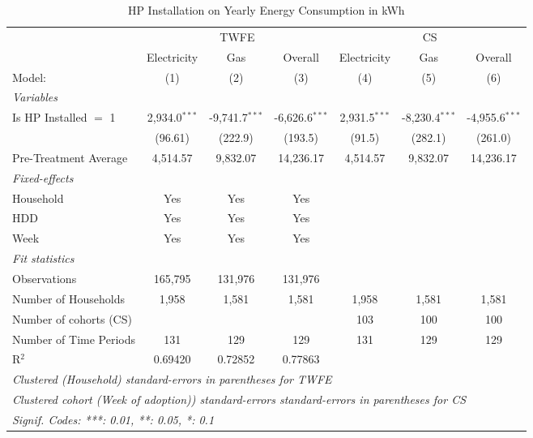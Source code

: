 
\begin{table}[htbp]
   \caption{\label{tab:hp-did-never-treated} HP Installation on Yearly Energy Consumption in kWh}
   \centering
   \begin{tabular}{lcccccc}
      \tabularnewline \midrule \midrule
       & \multicolumn{3}{c}{TWFE} & \multicolumn{3}{c}{CS} \\ 
                                     & Electricity     & Gas              & Overall          & Electricity     & Gas              & Overall \\   
      Model:                         & (1)             & (2)              & (3)              & (4)             & (5)              & (6)\\  
      \midrule
      \emph{Variables}\\
      Is HP Installed $=$ 1           &  2,934.0$^{***}$  &  -9,741.7$^{***}$  &  -6,626.6$^{***}$  & 2,931.5$^{***}$ & -8,230.4$^{***}$ & -4,955.6$^{***}$ \\
                                      &  (96.61)          &  (222.9)           &  (193.5)           & (91.5) & (282.1) & (261.0) \\
      \midrule
      Pre-Treatment Average          & 4,514.57        & 9,832.07         & 14,236.17        & 4,514.57        & 9,832.07         & 14,236.17\\  
\midrule
      \emph{Fixed-effects}\\
      Household                       &  Yes              &  Yes               &  Yes               &  &  &  \\
      HDD                             &  Yes              &  Yes               &  Yes               &  &  &  \\
      Week                            &  Yes              &  Yes               &  Yes               &  &  &  \\
      \midrule
      \emph{Fit statistics}\\
      Observations                    &  165,795          &  131,976           &  131,976           &  &  &  \\
      Number of Households  &  1,958            &  1,581             &  1,581             & 1,958 & 1,581 & 1,581 \\
Number of cohorts (CS) & & & & 103 & 100 & 100 \\
      Number of Time Periods          &  131              &  129               &  129               & 131 & 129 & 129 \\
      R$^2$                           &  0.69420          &  0.72852           &  0.77863           &  &  &  \\
      \midrule \midrule
\multicolumn{10}{l}{\emph{Clustered (Household) standard-errors in parentheses for TWFE}}\\
\multicolumn{10}{l}{\emph{Clustered cohort (Week of adoption)) standard-errors standard-errors in parentheses for CS}}\\
      \multicolumn{7}{l}{\emph{Signif. Codes: ***: 0.01, **: 0.05, *: 0.1}}\\
   \end{tabular}
\end{table}


